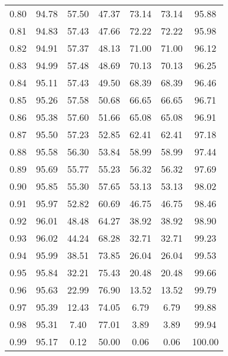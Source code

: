 \begin{tabular}{|c|c|c|c|c|c|c|}
      0.80 &     94.78 &     57.50 &      47.37 &   73.14 &      73.14 &         95.88 \\
      0.81 &     94.83 &     57.43 &      47.66 &   72.22 &      72.22 &         95.98 \\
      0.82 &     94.91 &     57.37 &      48.13 &   71.00 &      71.00 &         96.12 \\
      0.83 &     94.99 &     57.48 &      48.69 &   70.13 &      70.13 &         96.25 \\
      0.84 &     95.11 &     57.43 &      49.50 &   68.39 &      68.39 &         96.46 \\
      0.85 &     95.26 &     57.58 &      50.68 &   66.65 &      66.65 &         96.71 \\
      0.86 &     95.38 &     57.60 &      51.66 &   65.08 &      65.08 &         96.91 \\
      0.87 &     95.50 &     57.23 &      52.85 &   62.41 &      62.41 &         97.18 \\
      0.88 &     95.58 &     56.30 &      53.84 &   58.99 &      58.99 &         97.44 \\
      0.89 &     95.69 &     55.77 &      55.23 &   56.32 &      56.32 &         97.69 \\
      0.90 &     95.85 &     55.30 &      57.65 &   53.13 &      53.13 &         98.02 \\
      0.91 &     95.97 &     52.82 &      60.69 &   46.75 &      46.75 &         98.46 \\
      0.92 &     96.01 &     48.48 &      64.27 &   38.92 &      38.92 &         98.90 \\
      0.93 &     96.02 &     44.24 &      68.28 &   32.71 &      32.71 &         99.23 \\
      0.94 &     95.99 &     38.51 &      73.85 &   26.04 &      26.04 &         99.53 \\
      0.95 &     95.84 &     32.21 &      75.43 &   20.48 &      20.48 &         99.66 \\
      0.96 &     95.63 &     22.99 &      76.90 &   13.52 &      13.52 &         99.79 \\
      0.97 &     95.39 &     12.43 &      74.05 &    6.79 &       6.79 &         99.88 \\
      0.98 &     95.31 &      7.40 &      77.01 &    3.89 &       3.89 &         99.94 \\
      0.99 &     95.17 &      0.12 &      50.00 &    0.06 &       0.06 &        100.00 \\
\bottomrule
\end{tabular}
